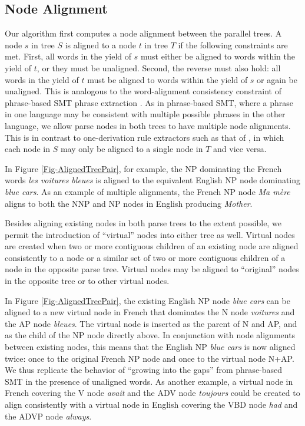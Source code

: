 \documentclass[11pt]{article}
\begin{document}
\subsection{Node Alignment}

Our algorithm first computes a node alignment between the parallel trees.  A node $s$ in tree $S$ is aligned to a node $t$ in tree $T$ if the following constraints are met.  First, all words in the yield of $s$ must either be aligned to words within the yield of $t$, or they must be unaligned.  Second, the reverse must also hold: all words in the yield of $t$ must be aligned to words within the yield of $s$ or again be unaligned.  This is analogous to the word-alignment consistency constraint of phrase-based SMT phrase extraction \cite{KoehnEtAl-PBSMT}.  As in phrase-based SMT, where a phrase in one language may be consistent with multiple possible phrases in the other language, we allow parse nodes in both trees to have multiple node alignments.  This is in contrast to one-derivation rule extractors such as that of , in which each node in $S$ may only be aligned to a single node in $T$ and vice versa.

In Figure \ref{Fig-AlignedTreePair}, for example, the NP dominating the French words {\it les voitures bleues} is aligned to the equivalent English NP node dominating {\it blue cars}.  As an example of multiple alignments, the French NP node {\it Ma m\`ere} aligns to both the NNP and NP nodes in English producing {\it Mother}.

Besides aligning existing nodes in both parse trees to the extent possible, we permit the introduction of ``virtual'' nodes into either tree as well.  Virtual nodes are created when two or more contiguous children of an existing node are aligned consistently to a node or a similar set of two or more contiguous children of a node in the opposite parse tree.  Virtual nodes may be aligned to ``original'' nodes in the opposite tree or to other virtual nodes.

In Figure \ref{Fig-AlignedTreePair}, the existing English NP node {\it blue cars} can be aligned to a new virtual node in French that dominates the N node {\it voitures} and the AP node {\it bleues}.  The virtual node is inserted as the parent of N and AP, and as the child of the NP node directly above.  In conjunction with node alignments between existing nodes, this means that the English NP {\it blue cars} is now aligned twice: once to the original French NP node and once to the virtual node N+AP.  We thus replicate the behavior of ``growing into the gaps'' from phrase-based SMT in the presence of unaligned words.  As another example, a virtual node in French covering the V node {\it avait} and the ADV node {\it toujours} could be created to align consistently with a virtual node in English covering the VBD node {\it had} and the ADVP node {\it always}.
\end{document}
